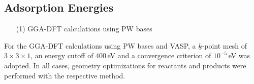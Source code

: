 \documentclass[11pt,DIV=13,BCOR=5mm,a4paper,headinclude]{scrbook}
\renewcommand{\vec}[1]{\underline{#1}}
\begin{document}

\subsection{Adsorption Energies}\label{sec:eads_crystal}
\begin{enumerate}
 \item[(1)] GGA-DFT calculations using PW bases
\end{enumerate}
For the GGA-DFT calculations using PW bases and VASP, a $\vec{k}$-point mesh of $3\times 3\times 1$, an energy cutoff of $400\,$eV and a convergence criterion of $10^{-5}\,$eV was adopted.
In all cases, geometry optimizations for reactants and products were performed with the respective method.
\end{document}
